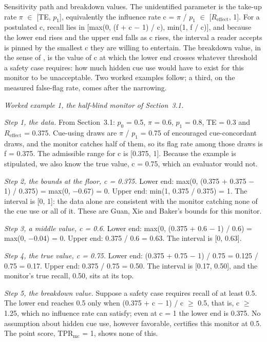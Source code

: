 \documentclass[11pt]{article}
\begin{document}
Sensitivity path and breakdown values. The unidentified parameter is the take-up rate $\pi$ $\in$ [TE, $p_1$], equivalently the influence rate c = $\pi$ / $p_1$ $\in$ [$R_{\mathrm{effect}}$, 1]. For a postulated c, recall lies in [max(0, (f + c $-$ 1) / c), min(1, f / c)], and because the lower end rises and the upper end falls as c rises, the interval a reader accepts is pinned by the smallest c they are willing to entertain. The breakdown value, in the sense of \citet{rosenbaum2002observational}, is the value of c at which the lower end crosses whatever threshold a safety case requires: how much hidden cue use would have to exist for this monitor to be unacceptable. Two worked examples follow; a third, on the measured false-flag rate, comes after the narrowing.

\emph{Worked example 1, the half-blind monitor of Section~3.1.}

\emph{Step 1, the data.} From Section~3.1: $p_0$ = 0.5, $\pi$ = 0.6, $p_1$ = 0.8, TE = 0.3 and $R_{\mathrm{effect}}$ = 0.375. Cue-using draws are $\pi$ / $p_1$ = 0.75 of encouraged cue-concordant draws, and the monitor catches half of them, so its flag rate among those draws is f = 0.375. The admissible range for c is [0.375, 1]. Because the example is stipulated, we also know the true value, c = 0.75, which an evaluator would not.

\emph{Step 2, the bounds at the floor, c = 0.375.} Lower end: max(0, (0.375 + 0.375 $-$ 1) / 0.375) = max(0, $-$0.67) = 0. Upper end: min(1, 0.375 / 0.375) = 1. The interval is [0, 1]: the data alone are consistent with the monitor catching none of the cue use or all of it. These are Guan, Xie and Baker's bounds for this monitor.

\emph{Step 3, a middle value, c = 0.6.} Lower end: max(0, (0.375 + 0.6 $-$ 1) / 0.6) = max(0, $-$0.04) = 0. Upper end: 0.375 / 0.6 = 0.63. The interval is [0, 0.63].

\emph{Step 4, the true value, c = 0.75.} Lower end: (0.375 + 0.75 $-$ 1) / 0.75 = 0.125 / 0.75 = 0.17. Upper end: 0.375 / 0.75 = 0.50. The interval is [0.17, 0.50], and the monitor's true recall, 0.50, sits at its top.

\emph{Step 5, the breakdown value.} Suppose a safety case requires recall of at least 0.5. The lower end reaches 0.5 only when (0.375 + c $-$ 1) / c $\geq$ 0.5, that is, c $\geq$ 1.25, which no influence rate can satisfy; even at c = 1 the lower end is 0.375. No assumption about hidden cue use, however favorable, certifies this monitor at 0.5. The point score, $\mathrm{TPR}_{\mathrm{mc}}$ = 1, shows none of this.
\end{document}
